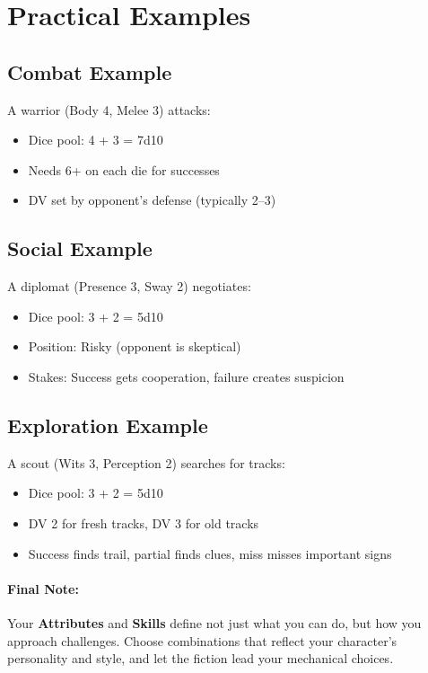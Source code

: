 \section{Practical Examples}

\subsection*{Combat Example}
A warrior (Body 4, Melee 3) attacks:
\begin{itemize}
\item Dice pool: 4 + 3 = 7d10
\item Needs 6+ on each die for successes
\item DV set by opponent's defense (typically 2--3)
\end{itemize}

\subsection*{Social Example}
A diplomat (Presence 3, Sway 2) negotiates:
\begin{itemize}
\item Dice pool: 3 + 2 = 5d10
\item Position: Risky (opponent is skeptical)
\item Stakes: Success gets cooperation, failure creates suspicion
\end{itemize}

\subsection*{Exploration Example}
A scout (Wits 3, Perception 2) searches for tracks:
\begin{itemize}
\item Dice pool: 3 + 2 = 5d10
\item DV 2 for fresh tracks, DV 3 for old tracks
\item Success finds trail, partial finds clues, miss misses important signs
\end{itemize}

\paragraph{Final Note:}
Your \textbf{Attributes} and \textbf{Skills} define not just what you can do, but how you approach challenges. Choose combinations that reflect your character's personality and style, and let the fiction lead your mechanical choices.

